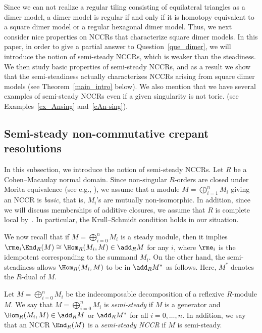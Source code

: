 Since we can not realize a regular tiling consisting of equilateral triangles as a dimer model, a dimer model is regular if and only if it is homotopy equivalent to a square dimer model or a regular hexagonal dimer model. Thus, we next consider nice properties on NCCRs that characterize square dimer models. In this paper, in order to give a partial answer to Question~\ref{que_dimer}, we will introduce the notion of semi-steady NCCRs, which is weaker than the steadiness. We then study basic properties of semi-steady NCCRs, and as a result we show that the semi-steadiness actually characterizes NCCRs arising from square dimer models (see Theorem~\ref{main_intro} below). We also mention that we have several examples of semi-steady NCCRs even if a given singularity is not toric. (see Examples~\ref{ex_Ansing} and~\ref{cAn-sing}).

\subsection{Semi-steady non-commutative crepant resolutions}\label{subsec_intro}

In this subsection, we introduce the notion of semi-steady NCCRs. Let $R$ be a Cohen--Macaulay normal domain. Since non-singular $R$-orders are closed under Morita equivalence (see e.g., \cite[Lemma~2.13]{IW2}), we assume that a module $M=\bigoplus^n_{i=1}M_i$ giving an NCCR is \emph{basic}, that is, $M_i$'s are mutually non-isomorphic. In addition, since we will discuss memberships of additive closures, we assume that $R$ is complete local by~\cite[Proposition~2.26]{IW2}. In particular, the Krull--Schmidt condition holds in our situation.

We now recall that if $M=\bigoplus_{i=0}^nM_i$ is a steady module, then it implies $\rme_i\End_R(M)\cong\Hom_R(M_i,M)\in\add_RM$ for any $i$, where $\rme_i$ is the idempotent corresponding to the summand $M_i$. On the other hand, the semi-steadiness allows $\Hom_R(M_i,M)$ to be in $\add_RM^*$ as follows. Here, $M^*$ denotes the $R$-dual of $M$.

\begin{defi}\label{def_semisteady}
Let $M=\bigoplus_{i=0}^nM_i$ be the indecomposable decomposition of a reflexive $R$-module $M$. We say that $M=\bigoplus_{i=0}^nM_i$ is \emph{semi-steady} if $M$ is a generator and $\Hom_R(M_i,M)\in\add_RM$ or $\add_RM^*$ for all $i=0,\dots,n$. In addition, we say that an NCCR $\End_R(M)$ is a \emph{semi-steady NCCR} if $M$ is semi-steady.
\end{defi}

